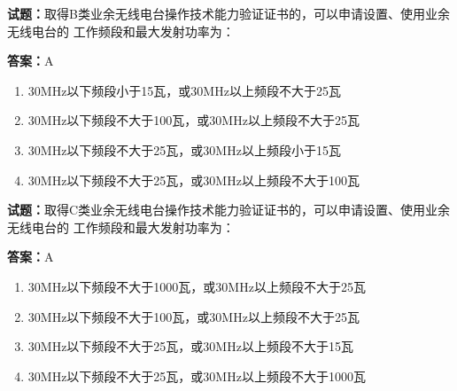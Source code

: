 \documentclass{ctexbook}
\begin{document}




\vspace{1em}

\textbf{试题：}取得B类业余无线电台操作技术能力验证证书的，可以申请设置、使用业余无线电台的
工作频段和最大发射功率为： 

\textbf{答案：}A 

\begin{enumerate}[leftmargin=3em]
  \item 30MHz以下频段小于15瓦，或30MHz以上频段不大于25瓦 

  \item 30MHz以下频段不大于100瓦，或30MHz以上频段不大于25瓦 

  \item 30MHz以下频段不大于25瓦，或30MHz以上频段小于15瓦 

  \item 30MHz以下频段不大于25瓦，或30MHz以上频段不大于100瓦 

\end{enumerate}





\vspace{1em}

\textbf{试题：}取得C类业余无线电台操作技术能力验证证书的，可以申请设置、使用业余无线电台的
工作频段和最大发射功率为： 

\textbf{答案：}A 

\begin{enumerate}[leftmargin=3em]
  \item 30MHz以下频段不大于1000瓦，或30MHz以上频段不大于25瓦 

  \item 30MHz以下频段不大于100瓦，或30MHz以上频段不大于25瓦 

  \item 30MHz以下频段不大于25瓦，或30MHz以上频段不大于15瓦 

  \item 30MHz以下频段不大于25瓦，或30MHz以上频段不大于1000瓦 

\end{enumerate}




\end{document}
